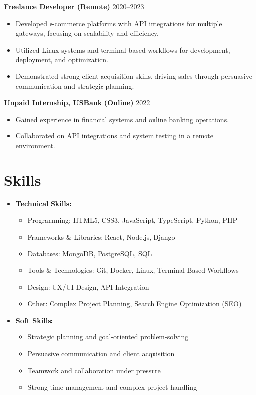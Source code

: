 \documentclass[a4paper,11pt]{article}
\begin{document}
\textbf{Freelance Developer (Remote)} \hfill 2020--2023
\begin{itemize}
    \item Developed e-commerce platforms with API integrations for multiple gateways, focusing on scalability and efficiency.
    \item Utilized Linux systems and terminal-based workflows for development, deployment, and optimization.
    \item Demonstrated strong client acquisition skills, driving sales through persuasive communication and strategic planning.
\end{itemize}

\textbf{Unpaid Internship, USBank (Online)} \hfill 2022
\begin{itemize}
    \item Gained experience in financial systems and online banking operations.
    \item Collaborated on API integrations and system testing in a remote environment.
\end{itemize}

\section*{Skills}
\begin{itemize}
    \item \textbf{Technical Skills:}
    \begin{itemize}
        \item Programming: HTML5, CSS3, JavaScript, TypeScript, Python, PHP
        \item Frameworks \& Libraries: React, Node.js, Django
        \item Databases: MongoDB, PostgreSQL, SQL
        \item Tools \& Technologies: Git, Docker, Linux, Terminal-Based Workflows
        \item Design: UX/UI Design, API Integration
        \item Other: Complex Project Planning, Search Engine Optimization (SEO)
    \end{itemize}
    \item \textbf{Soft Skills:}
    \begin{itemize}
        \item Strategic planning and goal-oriented problem-solving
        \item Persuasive communication and client acquisition
        \item Teamwork and collaboration under pressure
        \item Strong time management and complex project handling
    \end{itemize}
\end{itemize}
\end{document}
